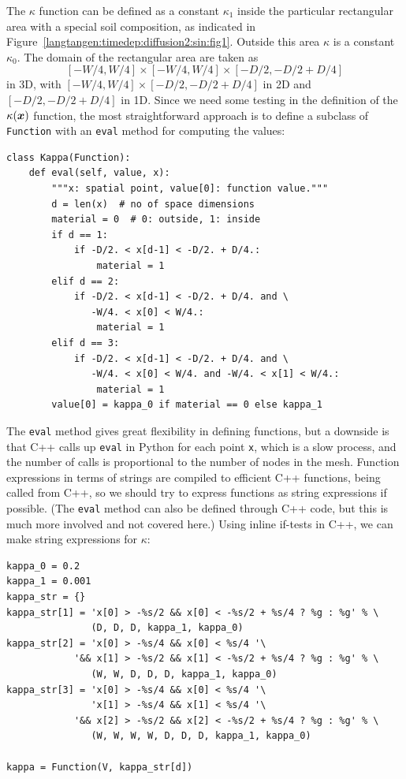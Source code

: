 The $\kappa$ function can be defined as a constant $\kappa_1$ inside
the particular rectangular area with a special soil composition, as
indicated in Figure~\ref{langtangen:timedep:diffusion2:sin:fig1}. Outside
this area $\kappa$ is a constant $\kappa_0$.
The domain of the rectangular area are taken as
\[ [-W/4, W/4]\times [-W/4, W/4]\times [-D/2, -D/2 + D/4]\]
in 3D, with $[-W/4, W/4]\times [-D/2, -D/2 + D/4]$ in 2D and
$[-D/2, -D/2 + D/4]$ in 1D.
Since we need some testing in the definition of the $\kappa({\mbox{\boldmath $x$}})$
function, the most straightforward approach is to define a subclass
of {\fontsize{12pt}{12pt}\texttt{Function}}
with an {\fontsize{12pt}{12pt}\texttt{eval}} method for computing the values:
\begin{Verbatim}[fontsize=\fontsize{10pt}{10pt},tabsize=8,baselinestretch=1.05,
fontfamily=tt,xleftmargin=7mm]
class Kappa(Function):
    def eval(self, value, x):
        """x: spatial point, value[0]: function value."""
        d = len(x)  # no of space dimensions
        material = 0  # 0: outside, 1: inside
        if d == 1:
            if -D/2. < x[d-1] < -D/2. + D/4.:
                material = 1
        elif d == 2:
            if -D/2. < x[d-1] < -D/2. + D/4. and \
               -W/4. < x[0] < W/4.:
                material = 1
        elif d == 3:
            if -D/2. < x[d-1] < -D/2. + D/4. and \
               -W/4. < x[0] < W/4. and -W/4. < x[1] < W/4.:
                material = 1
        value[0] = kappa_0 if material == 0 else kappa_1
\end{Verbatim}
\noindent
The {\fontsize{12pt}{12pt}\texttt{eval}} method gives great flexibility in defining functions,
but a downside is that C++ calls up {\fontsize{12pt}{12pt}\texttt{eval}} in Python for
each point {\fontsize{12pt}{12pt}\texttt{x}}, which is a slow process, and the number of calls
is proportional to the number of nodes in the mesh.
Function expressions in terms of strings are compiled to efficient
C++ functions, being called from C++, so we should try to express functions
as string expressions if possible. (The {\fontsize{12pt}{12pt}\texttt{eval}} method can also be
defined through C++ code, but this is much
more involved and not covered here.)
Using inline if-tests in C++, we can make string expressions for
$\kappa$:
\begin{Verbatim}[fontsize=\fontsize{10pt}{10pt},tabsize=8,baselinestretch=1.05,
fontfamily=tt,xleftmargin=7mm]
kappa_0 = 0.2
kappa_1 = 0.001
kappa_str = {}
kappa_str[1] = 'x[0] > -%s/2 && x[0] < -%s/2 + %s/4 ? %g : %g' % \
               (D, D, D, kappa_1, kappa_0)
kappa_str[2] = 'x[0] > -%s/4 && x[0] < %s/4 '\
            '&& x[1] > -%s/2 && x[1] < -%s/2 + %s/4 ? %g : %g' % \
               (W, W, D, D, D, kappa_1, kappa_0)
kappa_str[3] = 'x[0] > -%s/4 && x[0] < %s/4 '\
               'x[1] > -%s/4 && x[1] < %s/4 '\
            '&& x[2] > -%s/2 && x[2] < -%s/2 + %s/4 ? %g : %g' % \
               (W, W, W, W, D, D, D, kappa_1, kappa_0)

kappa = Function(V, kappa_str[d])
\end{Verbatim}
